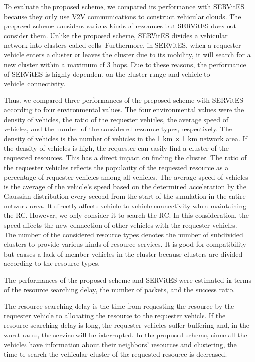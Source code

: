 \documentclass[sensors,article,accept,moreauthors,pdftex]{Definitions/mdpi}
\begin{document}
To evaluate the proposed scheme, we compared its performance with SERVitES because they only use V2V communications to construct vehicular clouds.
The proposed scheme considers various kinds of resources but SERVitES does not consider them.
Unlike the proposed scheme, SERVitES divides a vehicular network into clusters called cells.
Furthermore, in SERVitES, when a requester vehicle enters a cluster or leaves the cluster due to its mobility, it will search for a new cluster within a maximum of 3 hops.
Due to these reasons, the performance of SERVitES is highly dependent on the cluster range and vehicle-to-vehicle~connectivity.

Thus, we compared three performances of the proposed scheme with SERVitES according to four environmental values.
The four environmental values were the density of vehicles, the ratio of the requester vehicles, the average speed of vehicles, and the number of the considered resource types, respectively.
The density of vehicles is the number of vehicles in the 1 km $\times$ 1 km network area.
If the density of vehicles is high, the requester can easily find a cluster of the requested resources.
This has a direct impact on finding the cluster.
The ratio of the requester vehicles reflects the popularity of the requested resource as a percentage of requester vehicles among all vehicles.
The average speed of vehicles is the average of the vehicle's speed based on the determined acceleration by the Gaussian distribution every second from the start of the simulation in the entire network area.
It directly affects vehicle-to-vehicle connectivity when maintaining the RC.
However, we only consider it to search the RC.
In this consideration, the speed affects the new connection of other vehicles with the requester vehicles.
The number of the considered resource types denotes the number of subdivided clusters to provide various kinds of resource services.
It is good for compatibility but causes a lack of member vehicles in the cluster because clusters are divided according to the resource types.

The performances of the proposed scheme and SERVitES were estimated in terms of the resource searching delay, the number of packets, and the success ratio.

The resource searching delay is the time from requesting the resource by the requester vehicle to allocating the resource to the requester vehicle.
If the resource searching delay is long, the requester vehicles suffer buffering and, in the worst cases, the service will be interrupted.
In the proposed scheme, since all the vehicles have information about their neighbors' resources and clustering, the time to search the vehicular cluster of the requested resource is decreased.
\end{document}
